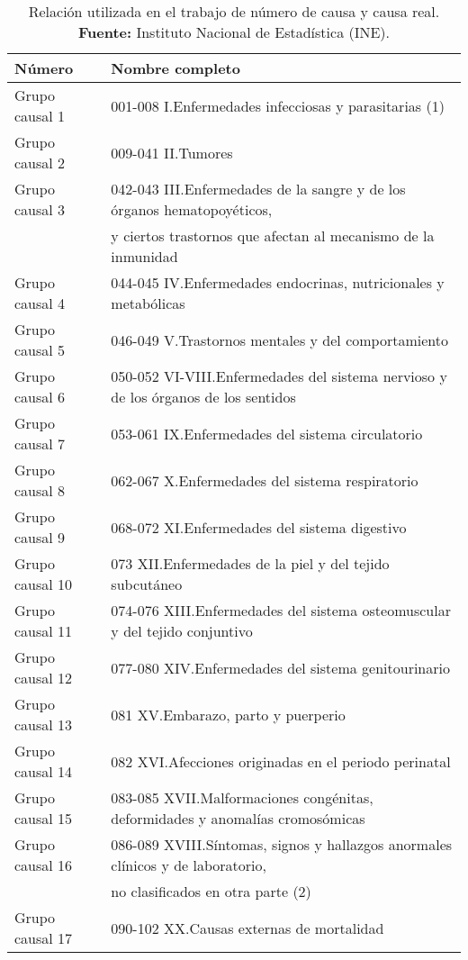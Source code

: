 \documentclass{article}
\begin{document}
\begin{table}[H]
\centering
\begin{tabular}{l|l}

 Número & Nombre completo \\ 
  \hline
Grupo causal 1 & 001-008  I.Enfermedades infecciosas y parasitarias (1) \\ 
 Grupo causal 2 & 009-041  II.Tumores \\ 
 Grupo causal 3 & 042-043  III.Enfermedades de la sangre y de los órganos hematopoyéticos,\\
 &	 y ciertos trastornos que afectan al mecanismo de la inmunidad \\ 
Grupo causal 4 & 044-045  IV.Enfermedades endocrinas, nutricionales y metabólicas \\ 
Grupo causal 5 & 046-049  V.Trastornos mentales y del comportamiento \\ 
Grupo causal 6 & 050-052  VI-VIII.Enfermedades del sistema nervioso y de los órganos de los sentidos \\ 
Grupo causal 7 & 053-061 IX.Enfermedades del sistema circulatorio \\ 
Grupo causal 8 & 062-067  X.Enfermedades del sistema respiratorio \\ 
Grupo causal 9 & 068-072  XI.Enfermedades del sistema digestivo \\ 
Grupo causal 10 & 073  XII.Enfermedades de la piel y del tejido subcutáneo \\ 
Grupo causal 11 & 074-076  XIII.Enfermedades del sistema osteomuscular y del tejido conjuntivo \\ 
Grupo causal 12 & 077-080  XIV.Enfermedades del sistema genitourinario \\ 
Grupo causal 13 & 081  XV.Embarazo, parto y puerperio \\ 
Grupo causal 14 & 082  XVI.Afecciones originadas en el periodo perinatal \\ 
Grupo causal 15 & 083-085  XVII.Malformaciones congénitas, deformidades y anomalías cromosómicas \\ 
Grupo causal 16 & 086-089  XVIII.Síntomas, signos y hallazgos anormales clínicos y de laboratorio,\\
& no clasificados en otra parte (2) \\ 
Grupo causal 17 & 090-102  XX.Causas externas de mortalidad \\ 

\end{tabular}
\caption{\centering Relación utilizada en el trabajo de número de causa y causa real.  \\ \textbf{Fuente:} Instituto Nacional de Estadística (INE).}
\label{causmean}
\end{table}
\end{document}
